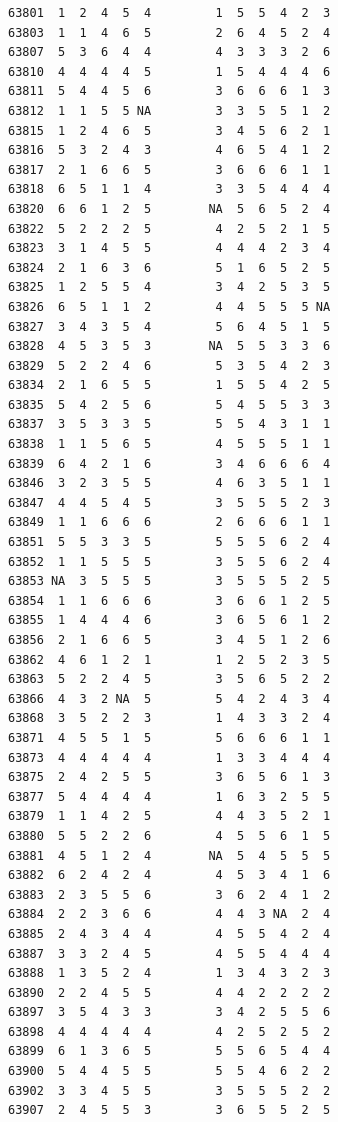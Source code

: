\documentclass[
  letterpaper,
  DIV=11,
  numbers=noendperiod]{scrreprt}
\begin{document}
\begin{verbatim}
63801  1  2  4  5  4         1  5  5  4  2  3
63803  1  1  4  6  5         2  6  4  5  2  4
63807  5  3  6  4  4         4  3  3  3  2  6
63810  4  4  4  4  5         1  5  4  4  4  6
63811  5  4  4  5  6         3  6  6  6  1  3
63812  1  1  5  5 NA         3  3  5  5  1  2
63815  1  2  4  6  5         3  4  5  6  2  1
63816  5  3  2  4  3         4  6  5  4  1  2
63817  2  1  6  6  5         3  6  6  6  1  1
63818  6  5  1  1  4         3  3  5  4  4  4
63820  6  6  1  2  5        NA  5  6  5  2  4
63822  5  2  2  2  5         4  2  5  2  1  5
63823  3  1  4  5  5         4  4  4  2  3  4
63824  2  1  6  3  6         5  1  6  5  2  5
63825  1  2  5  5  4         3  4  2  5  3  5
63826  6  5  1  1  2         4  4  5  5  5 NA
63827  3  4  3  5  4         5  6  4  5  1  5
63828  4  5  3  5  3        NA  5  5  3  3  6
63829  5  2  2  4  6         5  3  5  4  2  3
63834  2  1  6  5  5         1  5  5  4  2  5
63835  5  4  2  5  6         5  4  5  5  3  3
63837  3  5  3  3  5         5  5  4  3  1  1
63838  1  1  5  6  5         4  5  5  5  1  1
63839  6  4  2  1  6         3  4  6  6  6  4
63846  3  2  3  5  5         4  6  3  5  1  1
63847  4  4  5  4  5         3  5  5  5  2  3
63849  1  1  6  6  6         2  6  6  6  1  1
63851  5  5  3  3  5         5  5  5  6  2  4
63852  1  1  5  5  5         3  5  5  6  2  4
63853 NA  3  5  5  5         3  5  5  5  2  5
63854  1  1  6  6  6         3  6  6  1  2  5
63855  1  4  4  4  6         3  6  5  6  1  2
63856  2  1  6  6  5         3  4  5  1  2  6
63862  4  6  1  2  1         1  2  5  2  3  5
63863  5  2  2  4  5         3  5  6  5  2  2
63866  4  3  2 NA  5         5  4  2  4  3  4
63868  3  5  2  2  3         1  4  3  3  2  4
63871  4  5  5  1  5         5  6  6  6  1  1
63873  4  4  4  4  4         1  3  3  4  4  4
63875  2  4  2  5  5         3  6  5  6  1  3
63877  5  4  4  4  4         1  6  3  2  5  5
63879  1  1  4  2  5         4  4  3  5  2  1
63880  5  5  2  2  6         4  5  5  6  1  5
63881  4  5  1  2  4        NA  5  4  5  5  5
63882  6  2  4  2  4         4  5  3  4  1  6
63883  2  3  5  5  6         3  6  2  4  1  2
63884  2  2  3  6  6         4  4  3 NA  2  4
63885  2  4  3  4  4         4  5  5  4  2  4
63887  3  3  2  4  5         4  5  5  4  4  4
63888  1  3  5  2  4         1  3  4  3  2  3
63890  2  2  4  5  5         4  4  2  2  2  2
63897  3  5  4  3  3         3  4  2  5  5  6
63898  4  4  4  4  4         4  2  5  2  5  2
63899  6  1  3  6  5         5  5  6  5  4  4
63900  5  4  4  5  5         5  5  4  6  2  2
63902  3  3  4  5  5         3  5  5  5  2  2
63907  2  4  5  5  3         3  6  5  5  2  5

\end{verbatim}
\end{document}
